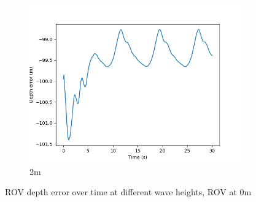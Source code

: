 \documentclass[class=article, crop=false]{standalone}
\begin{document}
\begin{figure}
\begin{subfigure}[b]{0.48\textwidth}
        \centering
        \includegraphics{scenario1/rov-0m/2.0m/rov_depth_error_uncontrolled}
        \caption{2m}
        \label{}
    \end{subfigure}

    \caption{ROV depth error over time at different wave heights, ROV at 0m}
\end{figure}
\end{document}
